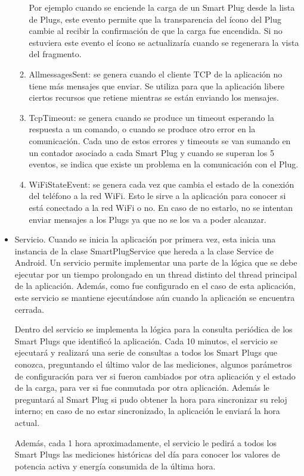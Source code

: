 \begin{itemize}
\begin{enumerate}
Por ejemplo cuando se enciende la carga de un Smart Plug desde la lista de Plugs, este evento permite que la transparencia del ícono del Plug cambie al recibir la confirmación de que la carga fue encendida. Si no estuviera este evento el ícono se actualizaría cuando se regenerara la vista del fragmento.
\item AllmessagesSent: se genera cuando el cliente TCP de la aplicación no tiene más mensajes que enviar. Se utiliza para que la aplicación libere ciertos recursos que retiene mientras se están enviando los mensajes.
\item TcpTimeout: se genera cuando se produce un timeout esperando la respuesta a un comando, o cuando se produce otro error en la comunicación. Cada uno de estos errores y timeouts se van sumando en un contador asociado a cada Smart Plug y cuando se superan los 5 eventos, se indica que existe un problema en la comunicación con el Plug.
\item WiFiStateEvent: se genera cada vez que cambia el estado de la conexión del teléfono a la red WiFi. Esto le sirve a la aplicación para conocer si está conectado a la red WiFi o no. En caso de no estarlo, no se intentan enviar mensajes a los Plugs ya que no se los va a poder alcanzar.
\end{enumerate}

\item Servicio. Cuando se inicia la aplicación por primera vez, esta inicia una instancia de la clase SmartPlugService que hereda a la clase Service de Android. Un servicio permite implementar una parte de la lógica que se debe ejecutar por un tiempo prolongado en un thread distinto del thread principal de la aplicación. Además, como fue configurado en el caso de esta aplicación, este servicio se mantiene ejecutándose aún cuando la aplicación se encuentra cerrada.

Dentro del servicio se implementa la lógica para la consulta periódica de los Smart Plugs que identificó la aplicación. Cada 10 minutos, el servicio se ejecutará y realizará una serie de consultas a todos los Smart Plugs que conozca, preguntando el último valor de las mediciones, algunos parámetros de configuración para ver si fueron cambiados por otra aplicación y el estado de la carga, para ver si fue conmutada por otra aplicación. Además le preguntará al Smart Plug si pudo obtener la hora para sincronizar su reloj interno; en caso de no estar sincronizado, la aplicación le enviará la hora actual.

Además, cada 1 hora aproximadamente, el servicio le pedirá a todos los Smart Plugs las mediciones históricas del día para conocer los valores de potencia activa y energía consumida de la última hora.


\end{itemize}
